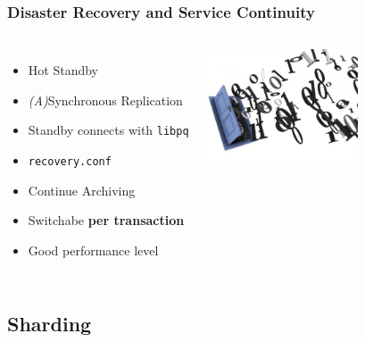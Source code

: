 \documentclass[english]{beamer}
\begin{document}
\begin{frame}[fragile]
  \frametitle{Disaster Recovery and Service Continuity}

  \linebreak

\begin{columns}[c]

  \begin{itemize}
   \item<1-> \alert{Hot Standby}
   \item<2-> \textit{(A)}Synchronous Replication
   \item<2-> Standby connects with \texttt{libpq}
   \item<3-> \texttt{recovery.conf}
   \item<3-> Continue Archiving
   \item<3-> Switchabe \textbf{per transaction}
   \item<4-> Good performance level
  \end{itemize}  

\includegraphics[height=9em]{bits.jpeg}
\end{columns}
\end{frame}


\subsection{Sharding}
\frame{\tableofcontents[currentsubsection]}
\end{document}

